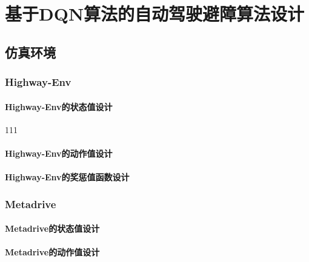 %
%
%
%
%

\chapter{基于DQN算法的自动驾驶避障算法设计}

\section{仿真环境} %

\subsection{Highway-Env}

\subsubsection{Highway-Env的状态值设计}
111
\subsubsection{Highway-Env的动作值设计}

\subsubsection{Highway-Env的奖惩值函数设计}

\subsection{Metadrive}

\subsubsection{Metadrive的状态值设计}

\subsubsection{Metadrive的动作值设计}

